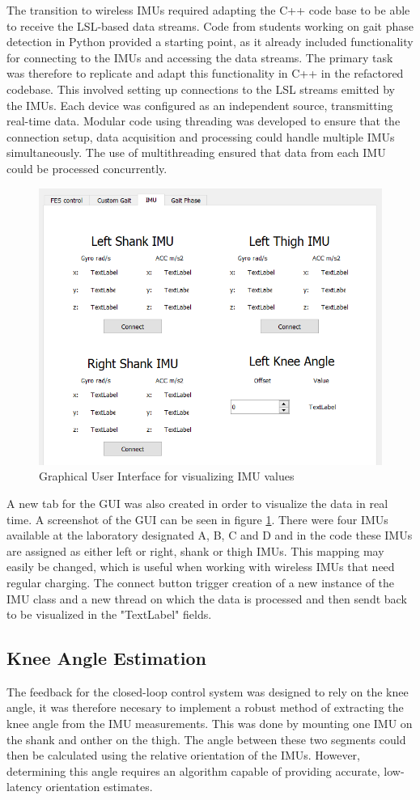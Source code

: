 The transition to wireless IMUs required adapting the C++ code base to be able to receive the LSL-based data streams. Code from students working on gait phase detection in Python provided a starting point, as it already included functionality for connecting to the IMUs and accessing the data streams. The primary task was therefore to replicate and adapt this functionality in C++ in the refactored codebase. This involved setting up connections to the LSL streams emitted by the IMUs. Each device was configured as an independent source, transmitting real-time data. Modular code using threading was developed to ensure that the connection setup, data acquisition and processing could handle multiple IMUs simultaneously. The use of multithreading ensured that data from each IMU could be processed concurrently. 

\begin{figure} [h]
    \centering
    \includegraphics[width=0.7\linewidth]{images/imugui1.png}
    \caption{Graphical User Interface for visualizing IMU values}
    \label{fig:imugui}
\end{figure}

A new tab for the GUI was also created in order to visualize the data in real time. A screenshot of the GUI can be seen in figure \ref{fig:imugui}. There were four IMUs available at the laboratory designated A, B, C and D and in the code these IMUs are assigned as either left or right, shank or thigh IMUs. This mapping may easily be changed, which is useful when working with wireless IMUs that need regular charging. The connect button trigger creation of a new instance of the IMU class and a new thread on which the data is processed and then sendt back to be visualized in the "TextLabel" fields.

\subsection{Knee Angle Estimation}
The feedback for the closed-loop control system was designed to rely on the knee angle, it was therefore necesary to implement a robust method of extracting the knee angle from the IMU measurements. This was done by mounting one IMU on the shank and onther on the thigh. The angle between these two segments could then be calculated using the relative orientation of the IMUs. However, determining this angle requires an algorithm capable of providing accurate, low-latency orientation estimates. 


